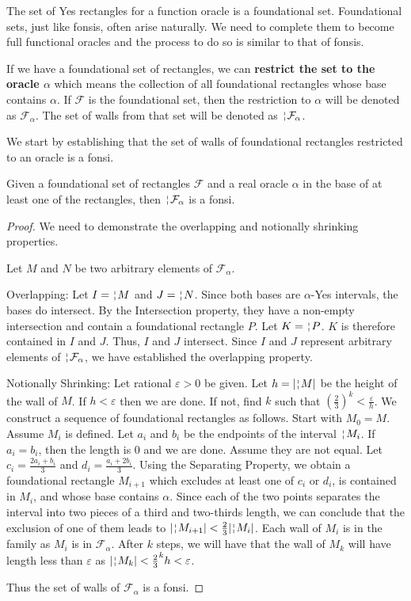 \documentclass[12pt]{article}
\begin{document}
The set of Yes rectangles for a function oracle is a foundational set. Foundational sets, just like fonsis, often arise naturally. We need to complete them to become full functional oracles and the process to do so is similar to that of fonsis. 

If we have a foundational set of rectangles, we can \textbf{restrict the set to the oracle $\alpha$} which means the collection of all foundational rectangles whose base contains $\alpha$. If $\mathcal{F}$ is the foundational set, then the restriction to $\alpha$ will be denoted as $\mathcal{F}_{\alpha}$. The set of walls from that set will be denoted as $\wall{\mathcal{F}_{\alpha}}$.

We start by establishing that the set of walls of foundational rectangles restricted to an oracle is a fonsi. 

\begin{proposition}
    Given a foundational set of rectangles $\mathcal{F}$ and a real oracle $\alpha$ in the base of at least one of the rectangles, then $\wall{\mathcal{F}_{\alpha}}$ is a fonsi. 
\end{proposition}

\begin{proof}
    We need to demonstrate the overlapping and notionally shrinking properties. 

    Let $M$ and $N$ be two arbitrary elements of $\mathcal{F}_{\alpha}$.

Overlapping: Let $I = \wall{M}$ and $J= \wall{N}$. Since both bases are $\alpha$-Yes intervals, the bases do intersect. By the Intersection property, they have a non-empty intersection and contain a foundational rectangle $P$. Let $K = \wall{P}$. $K$ is therefore contained in $I$ and $J$. Thus, $I$ and $J$ intersect. Since $I$ and $J$ represent arbitrary elements of $\wall{\mathcal{F}_{\alpha}}$, we have established the overlapping property. 

Notionally Shrinking: Let rational $\varepsilon > 0$ be given. Let $h = |\wall{M}|$ be the height of the wall of $M$. If $h < \varepsilon$ then we are done. If not, find $k$ such that $(\frac{2}{3})^k < \frac{\varepsilon}{h}$. We construct a sequence of foundational rectangles as follows. Start with $M_0= M$. Assume $M_i$ is defined. Let $a_i$ and $b_i$ be the endpoints of the interval $\wall{M_i}$. If $a_i=b_i$, then the length is 0 and we are done. Assume they are not equal. Let $c_i =\frac{2a_i + b_i}{3}$ and $d_i = \frac{a_i +2b_i}{3}$. Using the Separating Property, we obtain a foundational rectangle $M_{i+1}$ which excludes at least one of $c_i$ or $d_i$, is contained in $M_i$, and whose base contains $\alpha$. Since each of the two points separates the interval into two pieces of a third and two-thirds length, we can conclude that the exclusion of one of them leads to $|\wall{M_{i+1}}| < \frac{2}{3} |\wall{M_i}|$. Each wall of $M_i$ is in the family as $M_i$ is in $\mathcal{F}_{\alpha}$. After $k$ steps, we will have that the wall of $M_k$ will have length less than $\varepsilon$ as $|\wall{M_k}| < \frac{2}{3}^k h < \varepsilon$.  

Thus the set of walls of $\mathcal{F}_{\alpha}$ is a fonsi.
\end{proof}
\end{document}
